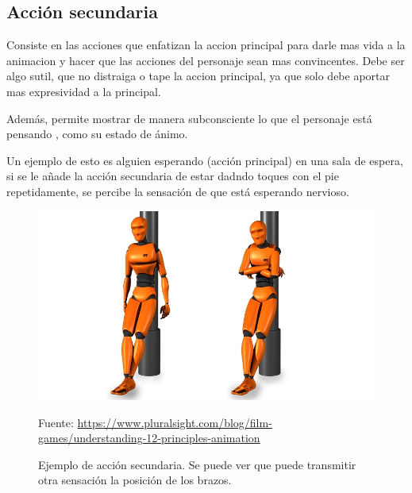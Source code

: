\documentclass{article}
\begin{document}
\subsection{Acción secundaria}

Consiste en las acciones que enfatizan la accion principal para darle mas vida a la animacion y hacer que las acciones del personaje sean mas convincentes. Debe ser algo sutil, que no distraiga o tape la accion principal, ya que solo debe aportar mas expresividad a la principal. \cite{plural}

\bigskip

Además, permite mostrar de manera subconsciente lo que el personaje está pensando \cite{idearocket}, como su estado de ánimo.

\bigskip

Un ejemplo de esto es alguien esperando (acción principal) en una sala de espera, si se le añade la acción secundaria de estar dadndo toques con el pie repetidamente, se percibe la sensación de que está esperando nervioso.

\begin{figure}[H]
    \centering
    \includegraphics[width=\textwidth]{imagenes/secondary-action.png}
    \caption{Ejemplo de acción secundaria. Se puede ver que puede transmitir otra sensación la posición de los brazos.}
    \vspace{10pt}
    \footnotesize{Fuente: \url{https://www.pluralsight.com/blog/film-games/understanding-12-principles-animation}}
\end{figure}
\end{document}

